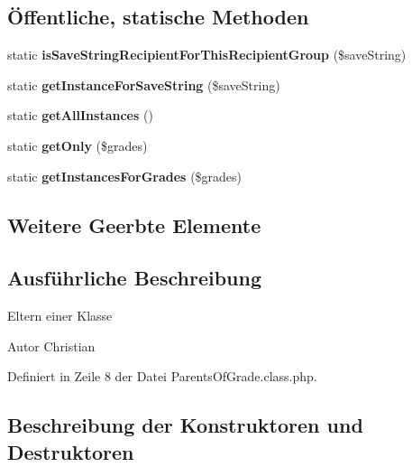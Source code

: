 \subsection*{Öffentliche, statische Methoden}
\begin{DoxyCompactItemize}
\item 
\mbox{\label{class_parents_of_grade_a50fe8bef44413ccd7b45a5cc9541cce8}} 
static {\bfseries is\+Save\+String\+Recipient\+For\+This\+Recipient\+Group} (\$save\+String)
\item 
\mbox{\label{class_parents_of_grade_a71e1668230b7e88dae895641484b1b6a}} 
static {\bfseries get\+Instance\+For\+Save\+String} (\$save\+String)
\item 
\mbox{\label{class_parents_of_grade_a73a731bdd6170adb51fbf502da8b1c5e}} 
static {\bfseries get\+All\+Instances} ()
\item 
\mbox{\label{class_parents_of_grade_a46a6257f6d4098e6502a51c212d0948e}} 
static {\bfseries get\+Only} (\$grades)
\item 
\mbox{\label{class_parents_of_grade_a9ba23589ea7a3fdc67f7392de2c64c1f}} 
static {\bfseries get\+Instances\+For\+Grades} (\$grades)
\end{DoxyCompactItemize}
\subsection*{Weitere Geerbte Elemente}


\subsection{Ausführliche Beschreibung}
Eltern einer Klasse \begin{DoxyAuthor}{Autor}
Christian 
\end{DoxyAuthor}


Definiert in Zeile 8 der Datei Parents\+Of\+Grade.\+class.\+php.



\subsection{Beschreibung der Konstruktoren und Destruktoren}
\mbox{\label{class_parents_of_grade_a51d5acefa69a4ad5d6af4d858c6360ff}} 
